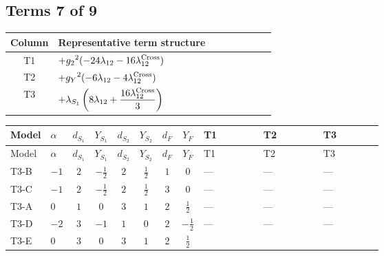\documentclass[8pt]{article}
\begin{document}
\begin{landscape}
\subsection*{Terms 7 of 9}
\begin{center}
\begin{tabular}{@{}c >{\raggedright\arraybackslash}p{0.82\linewidth}@{}}
\toprule
Column & Representative term structure \\
\midrule
T1 & \(\displaystyle +{g_2}^2 (-24 {\lambda_{12}}-16 {\lambda_{12}^{\rm Cross}})\) \\
\midrule
T2 & \(\displaystyle +{g_Y}^2 (-6 {\lambda_{12}}-4 {\lambda_{12}^{\rm Cross}})\) \\
\midrule
T3 & \(\displaystyle +{\lambda_{S_1}} \left(8 {\lambda_{12}}+\frac{16 {\lambda_{12}^{\rm Cross}}}{3}\right)\) \\
\midrule
\bottomrule
\end{tabular}
\end{center}
\smallskip
\tiny
\begin{longtable}{@{}llcccccc >{\raggedright\arraybackslash}p{0.21\linewidth} >{\raggedright\arraybackslash}p{0.21\linewidth} >{\raggedright\arraybackslash}p{0.21\linewidth}@{}}
\toprule
Model & $\alpha$ & $d_{S_1}$ & $Y_{S_1}$ & $d_{S_2}$ & $Y_{S_2}$ & $d_F$ & $Y_F$ & T1 & T2 & T3 \\
\midrule
\endfirsthead
\toprule
Model & $\alpha$ & $d_{S_1}$ & $Y_{S_1}$ & $d_{S_2}$ & $Y_{S_2}$ & $d_F$ & $Y_F$ & T1 & T2 & T3 \\
\midrule
\endhead
T3-B & $-1$ & $2$ & $-\frac{1}{2}$ & $2$ & $\frac{1}{2}$ & $1$ & $0$ & --- & --- & --- \\
\midrule
T3-C & $-1$ & $2$ & $-\frac{1}{2}$ & $2$ & $\frac{1}{2}$ & $3$ & $0$ & --- & --- & --- \\
\midrule
T3-A & $0$ & $1$ & $0$ & $3$ & $1$ & $2$ & $\frac{1}{2}$ & --- & --- & --- \\
\midrule
T3-D & $-2$ & $3$ & $-1$ & $1$ & $0$ & $2$ & $-\frac{1}{2}$ & --- & --- & --- \\
\midrule
T3-E & $0$ & $3$ & $0$ & $3$ & $1$ & $2$ & $\frac{1}{2}$ & \scriptsize\adjustbox{max width=\linewidth}{$\begin{gathered} +{g_2}^2 (-24 {\lambda_{12}}-16 {\lambda_{12}^{\rm Cross}})\end{gathered}$} & \scriptsize\adjustbox{max width=\linewidth}{$\begin{gathered} +{g_Y}^2 (-6 {\lambda_{12}}-4 {\lambda_{12}^{\rm Cross}})\end{gathered}$} & \scriptsize\adjustbox{max width=\linewidth}{$\begin{gathered} +{\lambda_{S_1}} \left(8 {\lambda_{12}}+\frac{16 {\lambda_{12}^{\rm Cross}}}{3}\right)\end{gathered}$} \\
\midrule
\bottomrule
\end{longtable}
\clearpage

\end{landscape}
\end{document}
